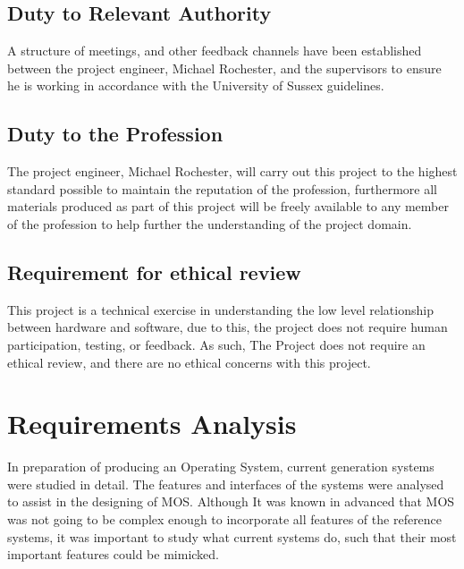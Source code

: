 \documentclass[a4paper]{report}
\begin{document}
\section{Duty to Relevant Authority}

A structure of meetings, and other feedback channels have been established between the project engineer, Michael Rochester, and the supervisors to ensure he is working in accordance with the University of Sussex guidelines.

\section{Duty to the Profession}

The project engineer, Michael Rochester, will carry out this project to the highest standard possible to maintain the reputation of the profession, furthermore all materials produced as part of this project will be freely available to any member of the profession to help further the understanding of the project domain.

\section{Requirement for ethical review}

This project is a technical exercise in understanding the low level relationship between hardware and software, due to this, the project does not require human participation, testing, or feedback. As such, The Project does not require an ethical review, and there are no ethical concerns with this project.



















\chapter{Requirements Analysis}

In preparation of producing an Operating System, current generation systems were studied in detail. The features and interfaces of the systems were analysed to assist in the designing of MOS. Although It was known in advanced that MOS was not going to be complex enough to incorporate all features of the reference systems, it was important to study what current systems do, such that their most important features could be mimicked.
\end{document}
